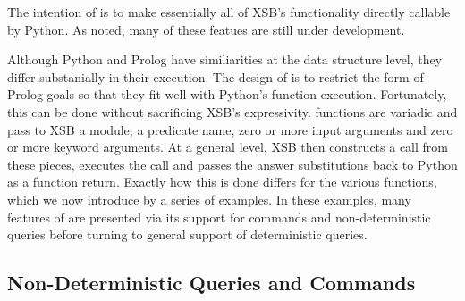 The intention of \px{} is to make essentially all of XSB's
functionality directly callable by Python.  As noted, many of these
featues are still under development.

Although Python and Prolog have similiarities at the data structure
level, they differ substanially in their execution.  The design of
\px{} is to restrict the form of Prolog goals so that they fit well
with Python's function execution.  Fortunately, this can be done
without sacrificing XSB's expressivity.  \px{} functions are variadic
and pass to XSB a module, a predicate name, zero or more input
arguments and zero or more keyword arguments.  At a general level, XSB
then constructs a call from these pieces, executes the call and passes
the answer substitutions back to Python as a function return. Exactly
how this is done differs for the various \px{} functions, which we now
introduce by a series of examples.  In these examples, many features
of \px{} are presented via its support for commands and
non-deterministic queries before turning to general support of
deterministic queries.

\subsection{Non-Deterministic Queries and Commands}

